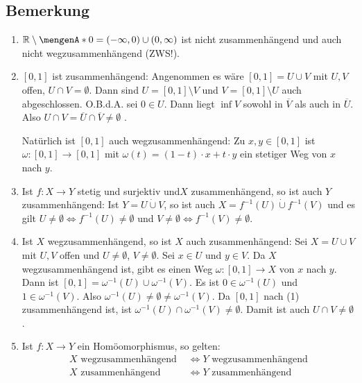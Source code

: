 \subsection[Bemerkungen zu zusammenhängenden und wegzusammenhängenden Räumen]{Bemerkung} %
\label{sub:82}
\begin{enumerate}[(1)]
	\item $\mathds{R} \setminus \set{0} = (-\infty,0) \cup (0, \infty)$ ist nicht zusammenhängend und auch nicht wegzusammenhängend (ZWS!).
	\item $[0,1]$ ist zusammenhängend: Angenommen es wäre $[0,1] = U \cup V$ mit $U, V$ offen, $U \cap V = \emptyset$. Dann sind $U= [0,1] \setminus V$ und 
	$V= [0,1] \setminus U$
	auch abgeschlossen. O.B.d.A. sei $0 \in U$. Dann liegt $\inf V$ sowohl in $\overline{V}$ als auch in $\overline{U}$. Also 
	$U \cap V = \overline{U} \cap \overline{V} \not= \emptyset $ \light.
	
	Natürlich ist $[0,1]$ auch wegzusammenhängend: Zu $x,y\in [0,1]$ ist $\omega : [0,1]\to [0,1]$ mit $\omega(t)=(1-t)\cdot x +t\cdot y$ ein stetiger Weg von $x$ nach $y$.
	\item Ist $f : X \to Y$ stetig und surjektiv und$X$ zusammenhängend, so ist auch $Y$ zusammenhängend: Ist $Y = U \dot{\cup} V$, so ist auch $X = f ^{-1}(U) \dot{\cup} f ^{-1}(V)$ und
	es gilt $U \not= \emptyset \Longleftrightarrow f ^{-1}(U) \not= \emptyset$ und $V \not= \emptyset \Longleftrightarrow f ^{-1}(V) \not= \emptyset$.
	\item Ist $X$ wegzusammenhängend, so ist $X$ auch zusammenhängend: Sei $X= U \cup V$ mit $U,V$ offen und $U \not= \emptyset$, $V \not= \emptyset$. Sei $x \in U$ und $y \in V$.
	Da $X$ wegzusammenhängend ist, gibt es einen Weg $\omega : [0,1] \to X$ von $x$ nach $y$. Dann ist $[0,1] = \omega ^{-1}(U) \cup \omega ^{-1}(V)$. Es ist 
	$0 \in \omega ^{-1} (U)$ und $1 \in \omega ^{-1}(V)$. Also $\omega ^{-1} (U) \not= \emptyset \not= \omega ^{-1}(V)$. Da $[0,1]$ nach (1) zusammenhängend ist, ist 
	$\omega ^{-1} (U) \cap \omega ^{-1}(V) \not= \emptyset$. Damit ist auch $U \cap V \not= \emptyset$.
	\item Ist $f : X \to Y$ ein Homöomorphismus, so gelten:
	\begin{align*}
		X \text{ wegzusammenhängend } &\iff Y \text{ wegzusammenhängend} \\
		X \text{ zusammenhängend } &\iff Y \text{ zusammenhängend}
	\end{align*}
\end{enumerate}

